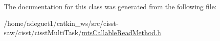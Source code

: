 The documentation for this class was generated from the following file\-:\begin{DoxyCompactItemize}
\item 
/home/adeguet1/catkin\-\_\-ws/src/cisst-\/saw/cisst/cisst\-Multi\-Task/\hyperlink{mts_callable_read_method_8h}{mts\-Callable\-Read\-Method.\-h}\end{DoxyCompactItemize}
